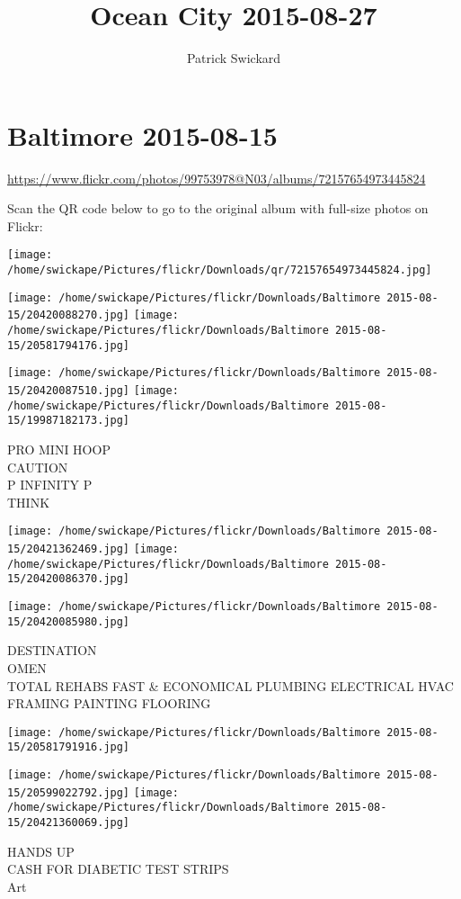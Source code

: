\documentclass[10pt,letterpaper]{article}
\title{Ocean City 2015-08-27}
\author{Patrick Swickard}
\date{}
\begin{document}
\section*{Baltimore 2015-08-15}

\url{https://www.flickr.com/photos/99753978@N03/albums/72157654973445824}

Scan the QR code below to go to the original album with full-size photos on Flickr:

\texttt{[image: /home/swickape/Pictures/flickr/Downloads/qr/72157654973445824.jpg]}
\pagebreak

\texttt{[image: /home/swickape/Pictures/flickr/Downloads/Baltimore 2015-08-15/20420088270.jpg]}
\texttt{[image: /home/swickape/Pictures/flickr/Downloads/Baltimore 2015-08-15/20581794176.jpg]}

\texttt{[image: /home/swickape/Pictures/flickr/Downloads/Baltimore 2015-08-15/20420087510.jpg]}
\texttt{[image: /home/swickape/Pictures/flickr/Downloads/Baltimore 2015-08-15/19987182173.jpg]}

PRO MINI HOOP\\
CAUTION\\
P INFINITY P\\
THINK
\pagebreak

\texttt{[image: /home/swickape/Pictures/flickr/Downloads/Baltimore 2015-08-15/20421362469.jpg]}
\texttt{[image: /home/swickape/Pictures/flickr/Downloads/Baltimore 2015-08-15/20420086370.jpg]}

\texttt{[image: /home/swickape/Pictures/flickr/Downloads/Baltimore 2015-08-15/20420085980.jpg]}

DESTINATION\\
OMEN\\
TOTAL REHABS FAST \& ECONOMICAL PLUMBING ELECTRICAL HVAC FRAMING PAINTING FLOORING
\pagebreak

\texttt{[image: /home/swickape/Pictures/flickr/Downloads/Baltimore 2015-08-15/20581791916.jpg]}

\vspace{0.25in}
\texttt{[image: /home/swickape/Pictures/flickr/Downloads/Baltimore 2015-08-15/20599022792.jpg]}
\texttt{[image: /home/swickape/Pictures/flickr/Downloads/Baltimore 2015-08-15/20421360069.jpg]}

HANDS UP\\
CASH FOR DIABETIC TEST STRIPS\\
Art
\pagebreak
\end{document}
